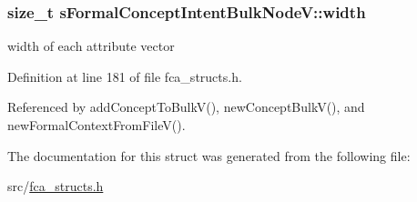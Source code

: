 \hypertarget{structsFormalConceptIntentBulkNodeV_ab6c271021365b30649e33b474862f5d8}{
\subsubsection[{width}]{\setlength{\rightskip}{0pt plus 5cm}size\-\_\-t {\bf s\-Formal\-Concept\-Intent\-Bulk\-Node\-V\-::width}}}\label{structsFormalConceptIntentBulkNodeV_ab6c271021365b30649e33b474862f5d8}


width of each attribute vector 



\-Definition at line 181 of file fca\-\_\-structs.\-h.



\-Referenced by add\-Concept\-To\-Bulk\-V(), new\-Concept\-Bulk\-V(), and new\-Formal\-Context\-From\-File\-V().



\-The documentation for this struct was generated from the following file\-:\begin{DoxyCompactItemize}
\item 
src/\hyperlink{fca__structs_8h}{fca\-\_\-structs.\-h}\end{DoxyCompactItemize}
